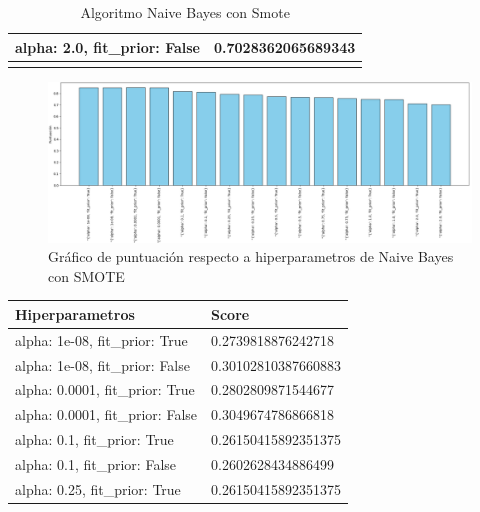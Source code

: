 \documentclass{report}
\begin{document}
{\begin{longtable}{|p{135.6px}|p{100.3px}|}
                    \hline
                    alpha: 2.0, fit\_prior: False & 0.7028362065689343 \\
                    \hline
                    \caption{Algoritmo Naive Bayes con Smote}
                \end{longtable}
                \begin{figure}[H]
                    \centering
                    \includegraphics[width=1\linewidth]{img/ibai3.png}
                    \caption{Gráfico de puntuación respecto a hiperparametros de Naive Bayes con SMOTE}
                \end{figure}
                \label{tab:resultados_analisis_sentimientos} 
                \begin{longtable}{|p{155.6px}|p{100.3px}|}
                    \hline
                    \textbf{Hiperparametros} & \textbf{Score}\\
                    \hline                    
                    alpha: 1e-08, fit\_prior: True&0.2739818876242718\\ 
                    \hline
                    alpha: 1e-08, fit\_prior: False&0.30102810387660883\\ 
                    \hline
                    alpha: 0.0001, fit\_prior: True&0.2802809871544677\\                     
                    \hline                    
                    alpha: 0.0001, fit\_prior: False&0.3049674786866818\\                     
                    \hline
                    alpha: 0.1, fit\_prior: True&0.26150415892351375\\                    
                    \hline                
                    alpha: 0.1, fit\_prior: False&0.2602628434886499\\                  
                    \hline
                    alpha: 0.25, fit\_prior: True&0.26150415892351375\\                    
                    \hline                  

\end{longtable}}
\end{document}
